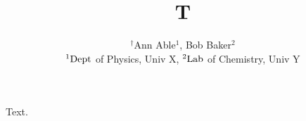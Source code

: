 \documentclass{article}
\begin{document}
\title{T}
\author{$^{\dagger}$Ann Able$^{1}$, Bob Baker$^{2}$\\ ${\rm ^1Dept}$ of Physics, Univ X, ${\rm ^2Lab}$ of Chemistry, Univ Y}
\maketitle
Text.
\end{document}
